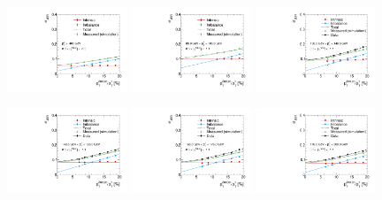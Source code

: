 \begin{figure}[ht]
 \centering
    \includegraphics[width=0.32\textwidth]{figures/resolution/results/JER_for_1_eta_bin_12_pTGamma_bin_all_contributions_PFCHS_RMS99_mc.pdf}
    \includegraphics[width=0.32\textwidth]{figures/resolution/results/JER_for_2_eta_bin_4_pTGamma_bin_all_contributions_PFCHS_RMS99_mc.pdf}
    \includegraphics[width=0.32\textwidth]{figures/resolution/results/JER_for_2_eta_bin_5_pTGamma_bin_all_contributions_PFCHS_RMS99_mc.pdf}

    \includegraphics[width=0.32\textwidth]{figures/resolution/results/JER_for_2_eta_bin_6_pTGamma_bin_all_contributions_PFCHS_RMS99_mc.pdf}
    \includegraphics[width=0.32\textwidth]{figures/resolution/results/JER_for_2_eta_bin_7_pTGamma_bin_all_contributions_PFCHS_RMS99_mc.pdf}
    \includegraphics[width=0.32\textwidth]{figures/resolution/results/JER_for_2_eta_bin_8_pTGamma_bin_all_contributions_PFCHS_RMS99_mc.pdf}


\end{figure}
